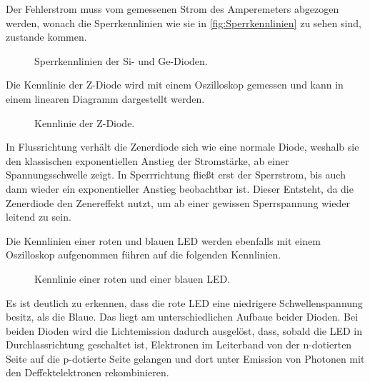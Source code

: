 \documentclass[
12pt,
a4paper,
bibliography=totocnumbered, %
BCOR=1cm, %
oneside, %
]{scrartcl}
\begin{document}
Der Fehlerstrom muss vom gemessenen Strom des Amperemeters abgezogen werden, wonach die Sperrkennlinien wie sie in \autoref{fig:Sperrkennlinien} zu sehen sind, zustande kommen.
\begin{figure}[H]
	\caption{Sperrkennlinien der Si- und Ge-Dioden.}
	\label{fig:Sperrkennlinien}
\end{figure}

Die Kennlinie der Z-Diode wird mit einem Oszilloskop gemessen und kann in einem linearen Diagramm dargestellt werden.
\begin{figure}[H]
	\caption{Kennlinie der Z-Diode.}
	\label{fig:KennlinieZ}
\end{figure}

In Flussrichtung verhält die Zenerdiode sich wie eine normale Diode, weshalb sie den klassischen exponentiellen Anstieg der Stromstärke, ab einer Spannungsschwelle zeigt. In Sperrrichtung fließt erst der Sperrstrom, bis auch dann wieder ein exponentieller Anstieg beobachtbar ist. Dieser Entsteht, da die Zenerdiode den Zenereffekt nutzt, um ab einer gewissen Sperrspannung wieder leitend zu sein.


Die Kennlinien einer roten und blauen LED werden ebenfalls mit einem Oszilloskop aufgenommen führen auf die folgenden Kennlinien.
\begin{figure}[H]
	\caption{Kennlinie einer roten und einer blauen LED.}
	\label{fig:KennlinieLED}
\end{figure}

Es ist deutlich zu erkennen, dass die rote LED eine niedrigere Schwellenspannung besitz, als die Blaue. Das liegt am unterschiedlichen Aufbaue beider Dioden. Bei beiden Dioden wird die Lichtemission dadurch ausgelöst, dass, sobald die LED in Durchlassrichtung geschaltet ist, Elektronen im Leiterband von der n-dotierten Seite auf die p-dotierte Seite gelangen und dort unter Emission von Photonen mit den Deffektelektronen rekombinieren.
\end{document}

